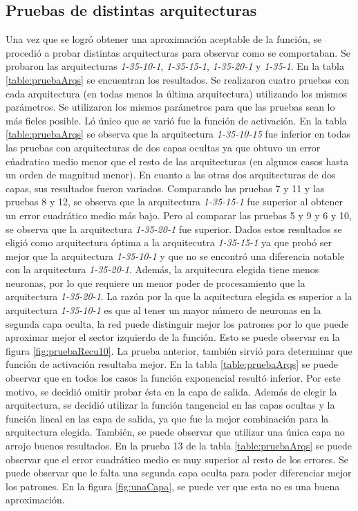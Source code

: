 \documentclass[11pt,a4paper]{article}
\begin{document}
\subsection{Pruebas de distintas arquitecturas}


Una vez que se logró obtener una aproximación aceptable de la función, se procedió a probar distintas arquitecturas para observar como se comportaban. Se probaron las arquitecturas \emph{1-35-10-1}, \emph{1-35-15-1}, \emph{1-35-20-1} y \emph{1-35-1}. En la tabla \ref{table:pruebaArqs} se encuentran los resultados. Se realizaron cuatro pruebas con cada arquitectura (en todas menos la última arquitectura) utilizando los mismos parámetros. Se utilizaron los mismos parámetros para que las pruebas sean lo más fieles posible. Ló único que se varió fue la función de activación. En la tabla \ref{table:pruebaArqs} se observa que la arquitectura \emph{1-35-10-15} fue inferior en todas las pruebas con arquitecturas de dos capas ocultas ya que obtuvo un error cúadratico medio menor que el resto de las arquitecturas (en algunos casos hasta un orden de magnitud menor). En cuanto a las otras dos arquitecturas de dos capas, sus resultados fueron variados. Comparando las pruebas 7 y 11 y las pruebas 8 y 12, se observa que la arquitectura \emph{1-35-15-1} fue superior al obtener un error cuadrático medio más bajo. Pero al comparar las pruebas 5 y 9 y 6 y 10, se observa que la arquitectura \emph{1-35-20-1} fue superior. Dados estos resultados se eligió como arquitectura óptima a la arquitecutra \emph{1-35-15-1} ya que probó ser mejor que la arquitectura \emph{1-35-10-1} y que no se encontró una diferencia notable con la arquitectura \emph{1-35-20-1}. Además, la arquitecura elegida tiene menos neuronas, por lo que requiere un menor poder de procesamiento que la arquitectura \emph{1-35-20-1}. La razón por la que la aquitectura elegida es superior a la arquitectura \emph{1-35-10-1} es que al tener un mayor número de neuronas en la segunda capa oculta, la red puede distinguir mejor los patrones por lo que puede aproximar mejor el sector izquierdo de la función. Esto se puede observar en la figura \ref{fig:pruebaRecu10}. La prueba anterior, también sirvió para determinar que función de activación resultaba mejor. En la tabla \ref{table:pruebaArqs} se puede observar que en todos los casos la función exponencial resultó inferior. Por este motivo, se decidió omitir probar ésta en la capa de salida. Además de elegir la arquitectura, se decidió utilizar la función tangencial en las capas ocultas y la función lineal en las capa de salida, ya que fue la mejor combinación para la arquitectura elegida. También, se puede observar que utilizar una única capa no arrojo buenos resultados. En la prueba 13 de la tabla \ref{table:pruebaArqs} se puede observar que el error cuadrático medio es muy superior al resto de los errores. Se puede observar que le falta una segunda capa oculta para poder diferenciar mejor los patrones. En la figura \ref{fig:unaCapa}, se puede ver que esta no es una buena aproximación.
\end{document}
